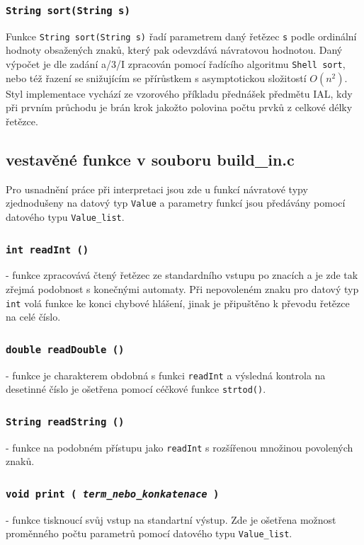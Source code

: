 \documentclass[a4paper,11pt]{article}
\begin{document}
\subsubsection {\texttt{String sort(String s)}}
Funkce \texttt{String sort(String s)} řadí parametrem daný řetězec \texttt{s} podle ordinální hodnoty obsažených znaků, který pak odevzdává návratovou hodnotou. Daný výpočet je dle zadání a/3/I zpracován pomocí řadícího algoritmu \texttt{Shell sort}, nebo též řazení se snižujícím se přírůstkem s asymptotickou složitostí $O(n^{2})$. Styl implementace vychází ze vzorového příkladu přednášek předmětu IAL, kdy při prvním průchodu je brán krok jakožto polovina počtu prvků z celkové délky řetězce.

\subsection {vestavěné funkce v souboru build{\_}in.c}
Pro usnadnění práce při interpretaci jsou zde u funkcí návratové typy zjednodušeny na datový typ \texttt{Value} a parametry funkcí jsou předávány pomocí datového typu \texttt{Value\_list}.

\subsubsection {\texttt{int readInt ()}} - funkce zpracovává čtený řetězec ze standardního vstupu po znacích a je zde tak zřejmá podobnost s konečnými automaty. Při nepovoleném znaku pro datový typ \texttt{int} volá funkce ke konci chybové hlášení, jinak je připuštěno k převodu řetězce na celé číslo.
\subsubsection {\texttt{double readDouble ()}} - funkce je charakterem obdobná s funkci \texttt{readInt} a výsledná kontrola na desetinné číslo je ošetřena pomocí céčkové funkce \texttt{strtod()}.
\subsubsection {\texttt{String readString ()}} - funkce na podobném přístupu jako \texttt{readInt} s rozšířenou množinou povolených znaků.
\subsubsection {\texttt{void print ( \emph{term\_nebo\_konkatenace} )}} - funkce tisknoucí svůj vstup na standartní výstup. Zde je ošetřena možnost proměnného počtu parametrů pomocí datového typu \texttt{Value\_list}. 
\end{document}
